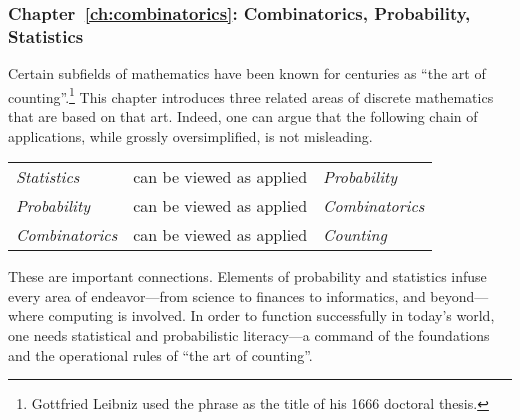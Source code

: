 \subsubsection{Chapter~\ref{ch:combinatorics}: 
Combinatorics, Probability, Statistics}

Certain subfields of mathematics have been known for centuries as ``the art of counting''.\footnote{Gottfried Leibniz used the phrase as the title of his 1666 doctoral thesis.}  This chapter introduces three related areas of discrete mathematics that are based on that art.  Indeed, one can argue that the following chain of applications, while grossly oversimplified, is not misleading.

\smallskip

\begin{tabular}{lcl}
{\it Statistics} & can be viewed as applied & {\it Probability} \\
{\it Probability} & can be viewed as applied & {\it Combinatorics} \\
{\it Combinatorics} & can be viewed as applied & {\it Counting}
\end{tabular}

\smallskip

\noindent
These are important connections.  Elements of probability and statistics infuse every area of endeavor---from science to finances to informatics, and beyond---where computing is involved.  In order to function successfully in today's world, one needs statistical and probabilistic literacy---a command of the foundations and the operational rules of ``the art of counting''.

